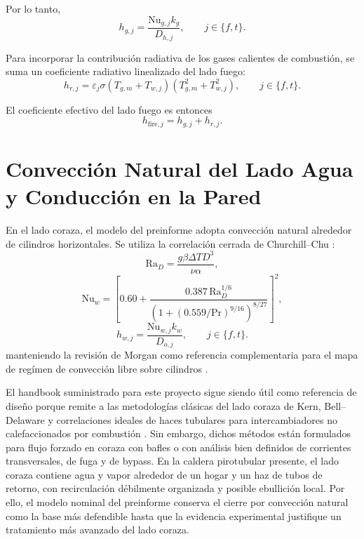 \documentclass[conference]{IEEEtran}
\begin{document}
Por lo tanto,
\begin{equation}
h_{g,j}=\frac{\mathrm{Nu}_{g,j}k_g}{D_{h,j}},
\qquad j\in\{f,t\}.
\label{eq:hg}
\end{equation}

Para incorporar la contribuci\'on radiativa de los gases calientes de combusti\'on, se suma un coeficiente radiativo linealizado del lado fuego:
\begin{equation}
h_{r,j}=\varepsilon_j \sigma (T_{g,m}+T_{w,j})(T_{g,m}^{2}+T_{w,j}^{2}),
\qquad j\in\{f,t\}.
\label{eq:hrad}
\end{equation}

El coeficiente efectivo del lado fuego es entonces
\begin{equation}
h_{\mathrm{fire},j}=h_{g,j}+h_{r,j}.
\label{eq:hfire}
\end{equation}

\section{Convecci\'on Natural del Lado Agua y Conducci\'on en la Pared}
En el lado coraza, el modelo del preinforme adopta convecci\'on natural alrededor de cilindros horizontales. Se utiliza la correlaci\'on cerrada de Churchill--Chu \cite{churchill1975}:
\begin{equation}
\mathrm{Ra}_D=\frac{g\beta \Delta T D^3}{\nu \alpha},
\label{eq:ra}
\end{equation}
\begin{equation}
\mathrm{Nu}_w=
\left[
0.60+\frac{0.387\,\mathrm{Ra}_D^{1/6}}
{\left(1+\left(0.559/\mathrm{Pr}\right)^{9/16}\right)^{8/27}}
\right]^2,
\label{eq:churchillchu}
\end{equation}
\begin{equation}
h_{w,j}=\frac{\mathrm{Nu}_{w,j}k_w}{D_{o,j}},
\qquad j\in\{f,t\}.
\label{eq:hw}
\end{equation}
manteniendo la revisi\'on de Morgan como referencia complementaria para el mapa de reg\'imen de convecci\'on libre sobre cilindros \cite{morgan1975}.

El handbook suministrado para este proyecto sigue siendo \'util como referencia de dise\~no porque remite a las metodolog\'ias cl\'asicas del lado coraza de Kern, Bell--Delaware y correlaciones ideales de haces tubulares para intercambiadores no calefaccionados por combusti\'on \cite{thulukkanam2013,bell1981,taborek1983}. Sin embargo, dichos m\'etodos est\'an formulados para flujo forzado en coraza con bafles o con an\'alisis bien definidos de corrientes transversales, de fuga y de bypass. En la caldera pirotubular presente, el lado coraza contiene agua y vapor alrededor de un hogar y un haz de tubos de retorno, con recirculaci\'on d\'ebilmente organizada y posible ebullici\'on local. Por ello, el modelo nominal del preinforme conserva el cierre por convecci\'on natural como la base m\'as defendible hasta que la evidencia experimental justifique un tratamiento m\'as avanzado del lado coraza.
\end{document}
